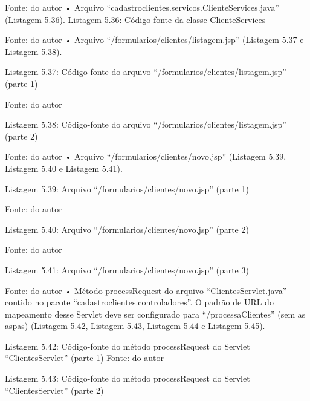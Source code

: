 Fonte: do autor
•	Arquivo ``cadastroclientes.servicos.ClienteServices.java'' (Listagem 5.36).
Listagem 5.36: Código-fonte da classe ClienteServices
 
Fonte: do autor
•	Arquivo ``/formularios/clientes/listagem.jsp'' (Listagem 5.37 e Listagem 5.38).



Listagem 5.37: Código-fonte do arquivo ``/formularios/clientes/listagem.jsp'' (parte 1)
 
Fonte: do autor









Listagem 5.38: Código-fonte do arquivo ``/formularios/clientes/listagem.jsp'' (parte 2)
 
Fonte: do autor
•	Arquivo ``/formularios/clientes/novo.jsp'' (Listagem 5.39, Listagem 5.40 e Listagem 5.41).









Listagem 5.39: Arquivo ``/formularios/clientes/novo.jsp'' (parte 1)
 
Fonte: do autor



Listagem 5.40: Arquivo ``/formularios/clientes/novo.jsp'' (parte 2)
 
Fonte: do autor



Listagem 5.41: Arquivo ``/formularios/clientes/novo.jsp'' (parte 3)
 
Fonte: do autor
•	Método processRequest do arquivo ``ClientesServlet.java'' contido no pacote ``cadastroclientes.controladores''. O padrão de URL do mapeamento desse Servlet deve ser configurado para ``/processaClientes'' (sem as aspas) (Listagem 5.42, Listagem 5.43, Listagem 5.44 e Listagem 5.45).














Listagem 5.42: Código-fonte do método processRequest do Servlet ``ClientesServlet'' (parte 1)
 Fonte: do autor






Listagem 5.43: Código-fonte do método processRequest do Servlet ``ClientesServlet'' (parte 2)
 
